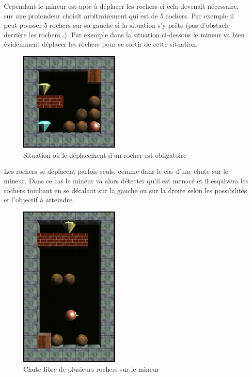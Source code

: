 \documentclass[a4paper,11pt]{article}
\begin{document}
Cependant le mineur est apte \`a d\'eplacer les rochers ci cela devenait n\'ecessaire, sur une profondeur choisit arbitrairement qui est de 5 rochers. Par exemple il peut pousser 5 rochers sur sa gauche si la situation s'y pr\^ete (pas d'obstacle derri\`ere les rochers\dots). Par exemple dans la situation ci-dessous le mineur va bien \'evidemment d\'eplacer les rochers pour se sortir de cette situation.

		\begin{figure}[h]
			\center
			\includegraphics[width=5cm]{rochers2}
			\caption{\label{deplacementRocher2} Situation o\`u le d\'eplacement d'un rocher est obligatoire}
		\end{figure}
		
\newpage
Les rochers se d\'eplacent parfois seuls, comme dans le cas d'une chute sur le mineur. Dans ce cas le mineur va alors d\'etecter qu'il est menac\'e et il esquivera les rochers tombant en se d\'ecalant sur la gauche ou sur la droite selon les possibilit\'es et l'objectif \`a atteindre.

		\begin{figure}[h]
			\center
			\includegraphics[width=5cm]{rochers3}
			\caption{\label{deplacementRocher3} Chute libre de plusieurs rochers sur le mineur}
		\end{figure}
		\clearpage
		
\end{document}
